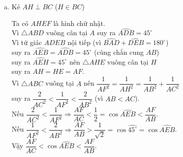 \begin{ex}
{\begin{enumerate}[a)]
\begin{center}
	 \end{center}
Ta có $\widehat{BAC} = \widehat{ANC} =  \widehat{AMB} = 90^\circ$(góc nội tiếp chắn nửa đường tròn)\\
Mặt khác $\widehat{BAM} =\widehat{ACN}$ (cùng phụ với góc $CAN$).\
Suy ra $\triangle AMB \backsim \triangle CNA$ (g-g)\\
$\Rightarrow \dfrac{S_{\triangle AMB}}{S_{\triangle CNA}} = \dfrac{1}{3}=\dfrac{AB^2}{AC^2}$\\
$\Rightarrow \dfrac{AB}{AC}=\dfrac{1}{\sqrt{3}} = \tan 30^\circ = \tan\widehat{ACB}$\\
suy ra $\widehat{ACB} = 30^\circ$; $\widehat{ABC} = 60^\circ$
\item 
Kẻ $AH\perp BC$ ($H\in BC$)
\begin{center}
\end{center}
Ta có $AHEF$ là hình chữ nhật.\\
Vì $\triangle ABD$ vuông cân tại $A$ suy ra $\widehat{ADB} = 45^\circ$\\
Vì tứ giác $ADEB$ nội tiếp (vì $\widehat{BAD}+\widehat{DEB} = 180^\circ$)\\
suy ra $\widehat{AEB} = \widehat{ADB} = 45^\circ$ (cùng chắn cung $AB$)\\
suy ra $\widehat{AEH} = 45^\circ$ nên $\triangle AHE$ vuông cân tại $H$\\
suy ra $AH = HE = AF$.\\
Vì $\triangle ABC$ vuông tại $A$ nên $\dfrac{1}{AF^2}=\dfrac{1}{AH^2}=\dfrac{1}{AB^2}+\dfrac{1}{AC^2}$\\
suy ra $\dfrac{2}{AC^2}<\dfrac{1}{AF^2}<\dfrac{2}{AB^2}$ (vì $AB < AC$).\\
Nếu $\dfrac{2}{AC^2}<\dfrac{1}{AF^2}\Rightarrow \dfrac{AF}{AC} <\dfrac{1}{2} = \cos\widehat{AEB} < \dfrac{AF}{AB}$.\\
Nếu $\dfrac{1}{AF^2}<\dfrac{2}{AB^2}\Rightarrow \dfrac{AF}{AB} > \dfrac{1}{\sqrt{2}} = \cos\widehat{45^\circ} = \cos\widehat{AEB}$.\\
Vậy $\dfrac{AF}{AC} <\cos\widehat{AEB} <\dfrac{AF}{AB}$.
	 \end{enumerate}
	 
	 }

\end{ex}



